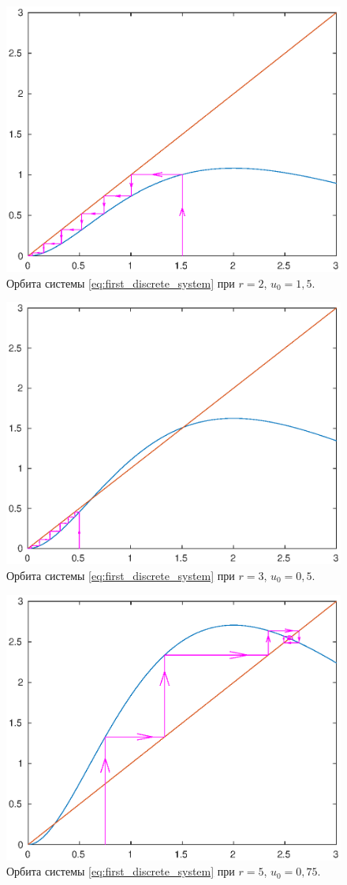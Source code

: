 \begin{figure}[h!]
        \centering
        \includegraphics[width=0.8\linewidth]{first_discrete_system/stability_of_fixed_points/r2start1-5.eps}
        \caption{Орбита системы \ref{eq:first_discrete_system} при $r = 2$, $u_0 = 1,5$.}
\end{figure}
\begin{figure}[h!]
        \centering
        \includegraphics[width=0.8\linewidth]{first_discrete_system/stability_of_fixed_points/r3start0-5.eps}
        \caption{Орбита системы \ref{eq:first_discrete_system} при $r = 3$, $u_0 = 0,5$.}
\end{figure}
\begin{figure}[h!]
        \centering
        \includegraphics[width=0.8\linewidth]{first_discrete_system/stability_of_fixed_points/r5start0-75.eps}
        \caption{Орбита системы \ref{eq:first_discrete_system} при $r = 5$, $u_0 = 0,75$.}
\end{figure}
